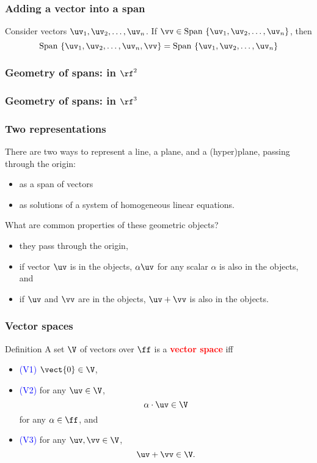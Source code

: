 \begin{frame}
  \frametitle{Adding a vector into a span}
  \begin{lemma}
    Consider vectors $\uv_1,\uv_2,\ldots,\uv_n$.
    If $\vv\in \mathrm{Span}\ \{\uv_1,\uv_2,\ldots,\uv_n\}$, then
    \[
    \mathrm{Span}\ \{\uv_1,\uv_2,\ldots,\uv_n,\vv\}
    =
    \mathrm{Span}\ \{\uv_1,\uv_2,\ldots,\uv_n\}
    \]
  \end{lemma}

  \vspace{2in}
\end{frame}

\begin{frame}
  \frametitle{Geometry of spans: in $\rf^2$}
\end{frame}

\begin{frame}
  \frametitle{Geometry of spans: in $\rf^3$}
\end{frame}

\begin{frame}
  \frametitle{Two representations}

  There are two ways to represent a line, a plane, and a (hyper)plane,
  passing through the origin:
  \begin{itemize}
  \item as a span of vectors
  \item as solutions of a system of homogeneous linear equations.
  \end{itemize}

  \pause
  \vspace{0.2in}

  What are common properties of these geometric objects?
  \pause
  \begin{itemize}
  \item they pass through the origin,
  \item if vector $\uv$ is in the objects, $\alpha\uv$ for any scalar $\alpha$ is also in the objects, and
  \item if $\uv$ and $\vv$ are in the objects, $\uv+\vv$ is also in
    the objects.
  \end{itemize}
\end{frame}

\begin{frame}
  \frametitle{Vector spaces}
  \begin{block}{Definition}
    A set $\V$ of vectors over $\ff$ is a \textcolor{red}{\bf vector space} iff
    \begin{itemize}
    \item \textcolor{blue}{(V1)} $\vect{0}\in\V$,
    \item \textcolor{blue}{(V2)} for any $\uv\in\V$,
      \[
      \alpha\cdot\uv\in\V
      \]
      for any
      $\alpha\in\ff$, and
    \item \textcolor{blue}{(V3)} for any $\uv,\vv\in\V$,
      \[
      \uv+\vv\in\V.
      \]
    \end{itemize}
  \end{block}
\end{frame}

